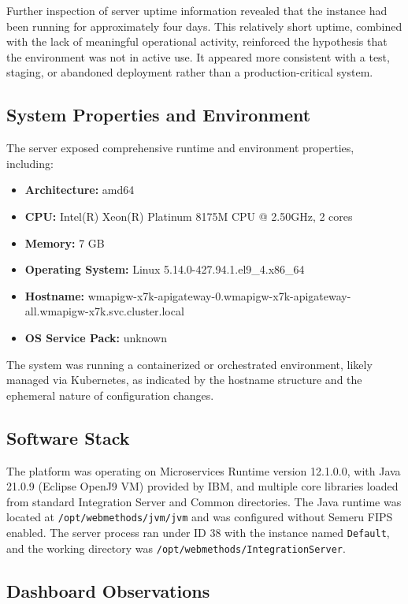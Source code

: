 \documentclass[12pt,a4paper]{report}
\begin{document}
Further inspection of server uptime information revealed that the instance had been running for approximately four days. This relatively short uptime, combined with the lack of meaningful operational activity, reinforced the hypothesis that the environment was not in active use. It appeared more consistent with a test, staging, or abandoned deployment rather than a production-critical system.

\subsection{System Properties and Environment}

The server exposed comprehensive runtime and environment properties, including:

\begin{itemize}
	\item \textbf{Architecture:} amd64
	\item \textbf{CPU:} Intel(R) Xeon(R) Platinum 8175M CPU @ 2.50GHz, 2 cores
	\item \textbf{Memory:} 7 GB
	\item \textbf{Operating System:} Linux 5.14.0-427.94.1.el9\_4.x86\_64
	\item \textbf{Hostname:} wmapigw-x7k-apigateway-0.wmapigw-x7k-apigateway-all.wmapigw-x7k.svc.cluster.local
	\item \textbf{OS Service Pack:} unknown
\end{itemize}

The system was running a containerized or orchestrated environment, likely managed via Kubernetes, as indicated by the hostname structure and the ephemeral nature of configuration changes.

\subsection{Software Stack}

The platform was operating on Microservices Runtime version 12.1.0.0, with Java 21.0.9 (Eclipse OpenJ9 VM) provided by IBM, and multiple core libraries loaded from standard Integration Server and Common directories. The Java runtime was located at \texttt{/opt/webmethods/jvm/jvm} and was configured without Semeru FIPS enabled. The server process ran under ID 38 with the instance named \texttt{Default}, and the working directory was \texttt{/opt/webmethods/IntegrationServer}.

\clearpage
\subsection{Dashboard Observations}
\end{document}

